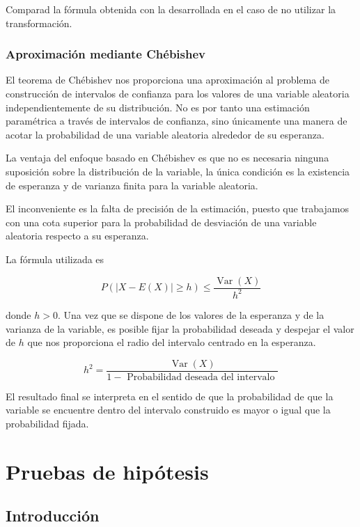 \documentclass[
]{article}
\begin{document}
Comparad la fórmula obtenida con la desarrollada en el caso de no utilizar la transformación.

\subsubsection{Aproximación mediante Chébishev}\label{aproximaciuxf3n-mediante-chuxe9bishev}

El teorema de Chébishev nos proporciona una aproximación al problema de construcción de intervalos de confianza para los valores de una variable aleatoria independientemente de su distribución. No es por tanto una estimación paramétrica a través de intervalos de confianza, sino únicamente una manera de acotar la probabilidad de una variable aleatoria alrededor de su esperanza.

La ventaja del enfoque basado en Chébishev es que no es necesaria ninguna suposición sobre la distribución de la variable, la única condición es la existencia de esperanza y de varianza finita para la variable aleatoria.

El inconveniente es la falta de precisión de la estimación, puesto que trabajamos con una cota superior para la probabilidad de desviación de una variable aleatoria respecto a su esperanza.

La fórmula utilizada es

\[
P(|X-E(X)| \geq h) \leq \frac{\operatorname{Var}(X)}{h^{2}}
\]

donde \(h>0\).
Una vez que se dispone de los valores de la esperanza y de la varianza de la variable, es posible fijar la probabilidad deseada y despejar el valor de \(h\) que nos proporciona el radio del intervalo centrado en la esperanza.

\[
h^{2}=\frac{\operatorname{Var}(X)}{1-\text { Probabilidad deseada del intervalo }}
\]

El resultado final se interpreta en el sentido de que la probabilidad de que la variable se encuentre dentro del intervalo construido es mayor o igual que la probabilidad fijada.

\section{Pruebas de hipótesis}\label{pruebas-de-hipuxf3tesis}

\subsection{Introducción}\label{introducciuxf3n-2}
\end{document}
